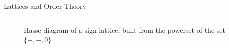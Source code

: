 \documentclass[aspectratio=169,14pt]{beamer}
\begin{document}
\begin{frame}{Lattices and Order Theory}
\begin{columns}[T]
\begin{column}{0.4\textwidth}
\begin{figure}[h]
    \caption{\footnotesize Hasse diagram of a sign lattice, built from the powerset of the set $\{+,-,0\}$}
  \end{figure}
  \end{column}
  \end{columns}
\end{frame}
\endgroup %
\end{document}
